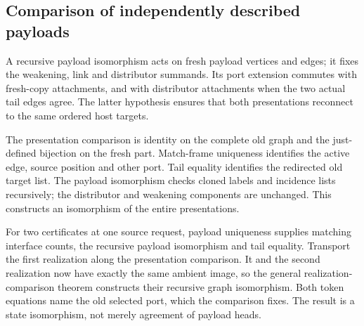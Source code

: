 

\subsection{Comparison of independently described payloads}

A recursive payload isomorphism acts on fresh payload vertices and edges;
it fixes the weakening, link and distributor summands. Its port extension
commutes with fresh-copy attachments, and with distributor attachments when
the two actual tail edges agree. The latter hypothesis ensures that both
presentations reconnect to the same ordered host targets.





The presentation comparison is identity on the complete old graph and the
just-defined bijection on the fresh part. Match-frame uniqueness identifies
the active edge, source position and other port. Tail equality identifies
the redirected old target list. The payload isomorphism checks cloned labels
and incidence lists recursively; the distributor and weakening components
are unchanged. This constructs an isomorphism of the entire presentations.


For two certificates at one source request, payload uniqueness supplies
matching interface counts, the recursive payload isomorphism and tail equality.
Transport the first realization along the presentation comparison. It and the
second realization now have exactly the same ambient image, so the general
realization-comparison theorem constructs their recursive graph isomorphism.
Both token equations name the old selected port, which the comparison fixes.
The result is a state isomorphism, not merely agreement of payload heads.

